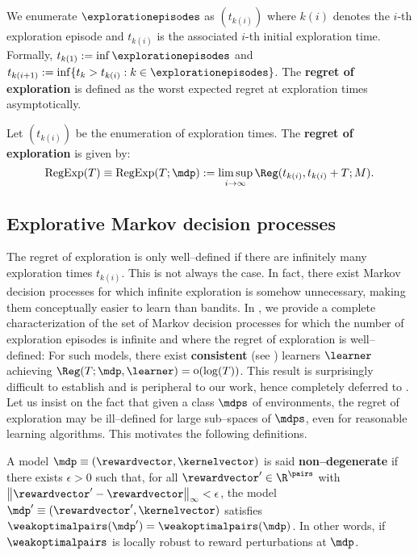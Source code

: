 \documentclass[preprint,cleveref,12pt]{colt2025}
\DeclarePairedDelimiter{\braces}{\{}{\}}	%
\DeclarePairedDelimiter{\norm}{\lVert}{\rVert}	%
\DeclareMathOperator*{\oh}{\mathrm{o}}
\def\model{\mdp}
\def\models{\mdps}
\def\kernel{\kernelvector}
\def\reward{\rewardvector}
\def\wkoptpairs{\weakoptimalpairs}
\DeclareMathOperator{\RegExp}{\mathrm{RegExp}}
\newcommand{\strong}[1]{\textbf{#1}}
\begin{document}
    We enumerate $\explorationepisodes$ as $(t_{k(i)})$ where $k(i)$ denotes the $i$-th exploration episode and $t_{k(i)}$ is the associated $i$-th initial exploration time. 
    Formally, $t_{k(1)} := \inf \explorationepisodes$ and $t_{k(i+1)} := \inf \braces{t_k > t_{k(i)} : k \in \explorationepisodes}$. 
    The \strong{regret of exploration} is defined as the worst expected regret at exploration times asymptotically.

    \begin{definition}
    \label{definition_regret_of_exploration}
        Let $(t_{k(i)})$ be the enumeration of exploration times.
        The \strong{regret of exploration} is given by:
        \begin{equation}
            \RegExp(T)
            \equiv \RegExp(T; \model)
            :=
            \limsup_{i \to \infty} \Reg(t_{k(i)}, t_{k(i)}+T; M)
            .
        \end{equation}
    \end{definition}
    
    \subsection{Explorative Markov decision processes}
    \label{section_well_definition}

    The regret of exploration is only well--defined  if there are infinitely many exploration times $t_{k(i)}$. 
    This is not always the case.
    In fact, there exist Markov decision processes for which infinite exploration is somehow unnecessary, making them conceptually easier to learn than bandits. 
    In , we provide a complete characterization of the set of Markov decision processes for which the number of exploration episodes is infinite and where the regret of exploration is well--defined:
    For such models, there exist \strong{consistent} (see \cite{salomon_lower_2013}) learners $\learner$ achieving $\Reg(T; \model, \learner) = \oh(\log(T))$. 
    This result is surprisingly difficult to establish and is peripheral to our work, hence completely deferred to .
    Let us insist on the fact that given a class $\models$ of environments, the regret of exploration may be ill--defined for large sub--spaces of $\models$, even for reasonable learning algorithms. 
    This motivates the following definitions.

    \begin{definition}
    \label{definition_non_degeneracy}
        A model $\model \equiv (\reward, \kernel)$ is said \strong{non--degenerate} if there exists $\epsilon > 0$ such that, for all $\reward' \in \R^\pairs$ with $\norm*{\reward' - \reward}_\infty < \epsilon$, the model $\model' \equiv (\reward', \kernel)$ satisfies $\wkoptpairs(\model') = \wkoptpairs(\model)$. 
        In other words, if $\wkoptpairs$ is locally robust to reward perturbations at $\model$. 
    \end{definition}
\end{document}
